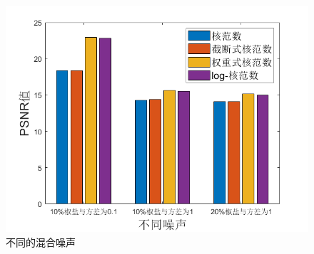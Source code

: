 \documentclass[10pt,aspectratio=43,mathserif]{beamer}
\begin{document}
\begin{frame}
\begin{figure}
\includegraphics[scale=0.2]{exp-type-mixed.png}
\caption{不同的混合噪声}
\end{figure}
\end{frame}
\end{document}
